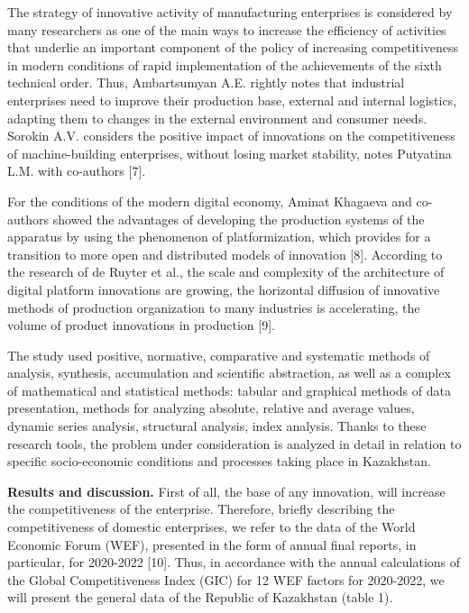 \begin{multicols}{2}
The strategy of innovative activity of manufacturing enterprises is
considered by many researchers as one of the main ways to increase the
efficiency of activities that underlie an important component of the
policy of increasing competitiveness in modern conditions of rapid
implementation of the achievements of the sixth technical order. Thus,
Ambartsumyan A.E. rightly notes that industrial enterprises need to
improve their production base, external and internal logistics, adapting
them to changes in the external environment and consumer needs. Sorokin
A.V. considers the positive impact of innovations on the competitiveness
of machine-building enterprises, without losing market stability, notes
Putyatina L.M. with co-authors {[}7{]}.

For the conditions of the modern digital economy, Aminat Khagaeva and
co-authors showed the advantages of developing the production systems of
the apparatus by using the phenomenon of platformization, which provides
for a transition to more open and distributed models of innovation
{[}8{]}. According to the research of de Ruyter et al., the scale and
complexity of the architecture of digital platform innovations are
growing, the horizontal diffusion of innovative methods of production
organization to many industries is accelerating, the volume of product
innovations in production {[}9{]}.

The study used positive, normative, comparative and systematic methods
of analysis, synthesis, accumulation and scientific abstraction, as well
as a complex of mathematical and statistical methods: tabular and
graphical methods of data presentation, methods for analyzing absolute,
relative and average values, dynamic series analysis, structural
analysis, index analysis. Thanks to these research tools, the problem
under consideration is analyzed in detail in relation to specific
socio-economic conditions and processes taking place in Kazakhstan.

{\bfseries Results and discussion.} First of all, the base of any
innovation, will increase the competitiveness of the enterprise.
Therefore, briefly describing the competitiveness of domestic
enterprises, we refer to the data of the World Economic Forum (WEF),
presented in the form of annual final reports, in particular, for
2020-2022 {[}10{]}. Thus, in accordance with the annual calculations of
the Global Competitiveness Index (GIC) for 12 WEF factors for 2020-2022,
we will present the general data of the Republic of Kazakhstan (table
1).
\end{multicols}

